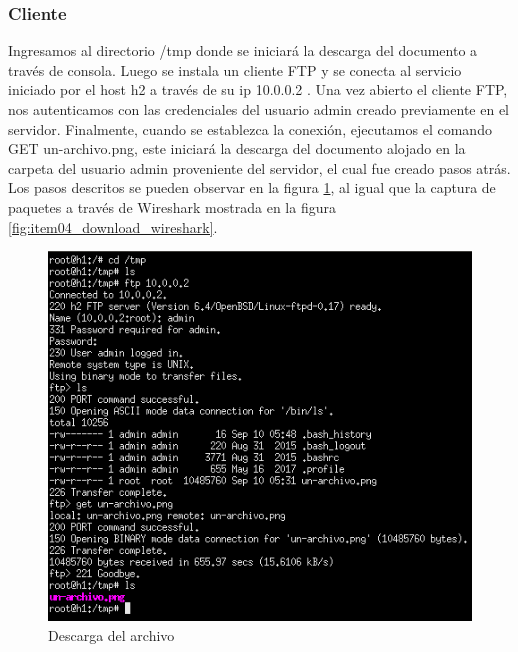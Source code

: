 \documentclass[10pt]{article}
\begin{document}
\subsubsection*{Cliente}




\begin{multicols}{2}

Ingresamos al directorio /tmp donde se iniciará la descarga del documento a través de consola. Luego se instala un cliente FTP y se conecta al servicio iniciado por el host h2 a través de su ip 10.0.0.2 . Una vez abierto el cliente FTP, nos autenticamos con las credenciales del usuario admin creado previamente en el servidor. Finalmente, cuando se establezca la conexión, ejecutamos el comando GET un-archivo.png, este iniciará la descarga del documento alojado en la carpeta del usuario admin proveniente del servidor, el cual fue creado pasos atrás. Los pasos descritos se pueden observar en la figura \ref{fig:item04_download}, al igual que la captura de paquetes a través de Wireshark mostrada en la figura \ref{fig:item04_download_wireshark}.


\columnbreak

\begin{figure}[H]
    \centering
    \includegraphics[width=\linewidth]{Imagenes/item04_ftp_client_download.png}
    \caption{Descarga del archivo}
    \label{fig:item04_download}
\end{figure}


\end{multicols}
\end{document}
